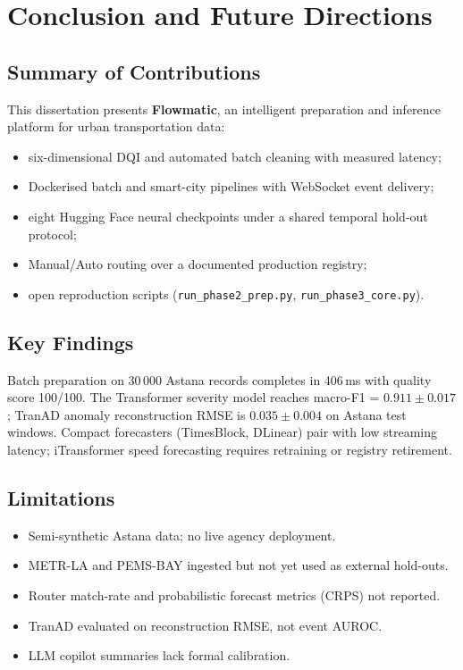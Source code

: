 %
%

\chapter{Conclusion and Future Directions}
\label{chap:conclusion}

\section{Summary of Contributions}

This dissertation presents \textbf{Flowmatic}, an intelligent preparation and inference platform for urban transportation data:
\begin{itemize}
  \item six-dimensional DQI and automated batch cleaning with measured latency;
  \item Dockerised batch and smart-city pipelines with WebSocket event delivery;
  \item eight Hugging Face neural checkpoints under a shared temporal hold-out protocol;
  \item Manual/Auto routing over a documented production registry;
  \item open reproduction scripts (\texttt{run\_phase2\_prep.py}, \texttt{run\_phase3\_core.py}).
\end{itemize}

\section{Key Findings}

Batch preparation on 30\,000 Astana records completes in 406\,ms with quality score 100/100. The Transformer severity model reaches macro-F1 = $0.911 \pm 0.017$; TranAD anomaly reconstruction RMSE is $0.035 \pm 0.004$ on Astana test windows. Compact forecasters (TimesBlock, DLinear) pair with low streaming latency; iTransformer speed forecasting requires retraining or registry retirement.

\section{Limitations}

\begin{itemize}
  \item Semi-synthetic Astana data; no live agency deployment.
  \item METR-LA and PEMS-BAY ingested but not yet used as external hold-outs.
  \item Router match-rate and probabilistic forecast metrics (CRPS) not reported.
  \item TranAD evaluated on reconstruction RMSE, not event AUROC.
  \item LLM copilot summaries lack formal calibration.
\end{itemize}

